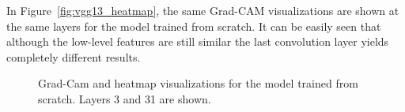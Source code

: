 In Figure~\ref{fig:vgg13_heatmap}, the same Grad-CAM visualizations are shown at the same layers for the model trained from scratch. It can be easily seen that although the low-level features are still similar the last convolution layer yields completely different results. \\


\begin{figure}[!h]
\centering
\caption{Grad-Cam and heatmap visualizations for the model trained from scratch. Layers 3 and 31 are shown.}



\end{figure}
